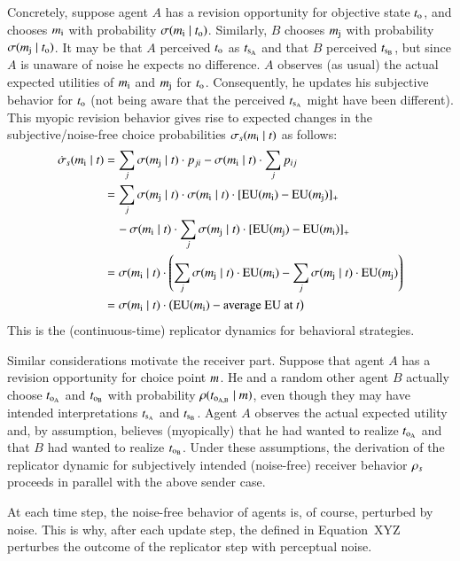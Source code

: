 \documentclass[fleqn,reqno,10pt]{article}
\newcommand{\rdd}{\acro{rdd}} %
\begin{document}
Concretely, suppose agent $A$ has a revision opportunity for objective
state $t_{\mathrm{o}}$, and chooses $m_{\mathrm{i}}$ with probability
$\sigma(m_{\mathrm{i}} \mid t_{\mathrm{o}})$. Similarly, $B$ chooses
$m_{\mathrm{j}}$ with probability $\sigma(m_{\mathrm{j}} \mid
t_{\mathrm{o}})$. It may be that $A$ perceived $t_{\mathrm{o}}$ as
$t_{\mathrm{s_A}}$ and that $B$ perceived $t_{\mathrm{s_B}}$, but since $A$
is unaware of noise he expects no difference. $A$ observes (as usual)
the actual expected utilities of $m_{\mathrm{i}}$ and $m_{\mathrm{j}}$ for
$t_{\mathrm{o}}$. Consequently, he updates his subjective behavior for
$t_{\mathrm{o}}$ (not being aware that the perceived $t_{\mathrm{s_A}}$
might have been different). This myopic revision behavior gives rise
to expected changes in the subjective/noise-free choice probabilities
$\sigma_s(m_{\mathrm{i}} \mid t)$ as follows:
\begin{align*}
  \dot{\sigma}_s(m_{\mathrm{i}} \mid t) & = \sum_j
  \sigma(m_{\mathrm{j}} \mid t) \cdot p_{ji} -  
  \sigma(m_{\mathrm{i}} \mid t) \cdot \sum_j p_{ij} \\
  & = \sum_j  \sigma(m_{\mathrm{j}} \mid t) \cdot
    \sigma(m_{\mathrm{i}} \mid t) \cdot [\mathrm{EU}(m_{\mathrm{i}}) -
    \mathrm{EU}(m_{\mathrm{j}})]_+ \\ 
   & \ \ \ \  - \sigma(m_{\mathrm{i}} \mid t) \cdot \sum_j
   \sigma(m_{\mathrm{j}} \mid t) \cdot [\mathrm{EU}(m_{\mathrm{j}}) -
    \mathrm{EU}(m_{\mathrm{i}})]_+ \\
   & = \sigma(m_{\mathrm{i}} \mid t) \cdot \left ( \sum_j
     \sigma(m_{\mathrm{j}} \mid t) \cdot \mathrm{EU}(m_{\mathrm{i}}) - \sum_j
     \sigma(m_{\mathrm{j}} \mid t) \cdot \mathrm{EU}(m_{\mathrm{j}})
   \right ) \\
   & = \sigma(m_{\mathrm{i}} \mid t) \cdot \left (
     \mathrm{EU}(m_{\mathrm{i}}) - \text{average EU at $t$} \right )
\end{align*}
This is the (continuous-time) replicator dynamics for behavioral
strategies.

Similar considerations motivate the receiver part. Suppose that agent
$A$ has a revision opportunity for choice point $m$. He and a
random other agent $B$ actually choose $t_{\mathrm{o_A}}$ and
$t_{\mathrm{o_B}}$ with probability $\rho(t_{\mathrm{o_{A,B}}} \mid
m)$, even though they may have intended interpretations
$t_{\mathrm{s_A}}$ and $t_{\mathrm{s_B}}$. Agent $A$ observes the actual
expected utility and, by assumption, believes (myopically) that he had
wanted to realize $t_{\mathrm{o_A}}$ and that $B$ had wanted to realize
$t_{\mathrm{o_B}}$. Under these assumptions, the derivation of the
replicator dynamic for subjectively intended (noise-free) receiver
behavior $\rho_s$ proceeds in parallel with the above sender case.

At each time step, the noise-free behavior of agents is, of course,
perturbed by noise. This is why, after each update step, the \rdd
defined in Equation~XYZ perturbes the outcome of the replicator step
with perceptual noise.



\printbibliography[heading=bibintoc]
\end{document}
